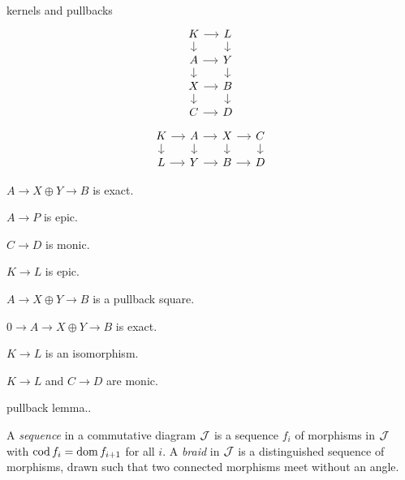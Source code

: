 \documentclass{../../large}
\begin{document}
\begin{prb}
kernels and pullbacks
\[\begin{tikzcd}[sep=small]
K\dar\rar&L\dar \\
A\dar\rar&Y\dar \\
X\dar\rar&B\dar \\
C\rar&D
\end{tikzcd}\]
\[\begin{tikzcd}[sep=small]
K\dar\rar&A\dar\rar&X\dar\rar&C\dar\\
L\rar&Y\rar&B\rar&D
\end{tikzcd}\]

\begin{parts}
\item $A\to X\oplus Y\to B$ is exact.
\item $A\to P$ is epic.
\item $C\to D$ is monic.
\item $K\to L$ is epic.
\end{parts}

\begin{parts}
\item $A\to X\oplus Y\to B$ is a pullback square.
\item $0\to A\to X\oplus Y\to B$ is exact.
\item $K\to L$ is an isomorphism.
\item $K\to L$ and $C\to D$ are monic.
\end{parts}

\end{prb}

pullback lemma..


A \emph{sequence} in a commutative diagram $\mathcal{J}$ is a sequence $f_i$ of morphisms in $\mathcal{J}$ with $\operatorname{cod} f_i=\operatorname{dom} f_{i+1}$ for all $i$.
A \emph{braid} in $\mathcal{J}$ is a distinguished sequence of morphisms, drawn such that two connected morphisms meet without an angle.



\begin{prb}
\end{prb}



\begin{prb}
\end{prb}

\begin{prb}
\end{prb}

\begin{prb}
\end{prb}
\end{document}

